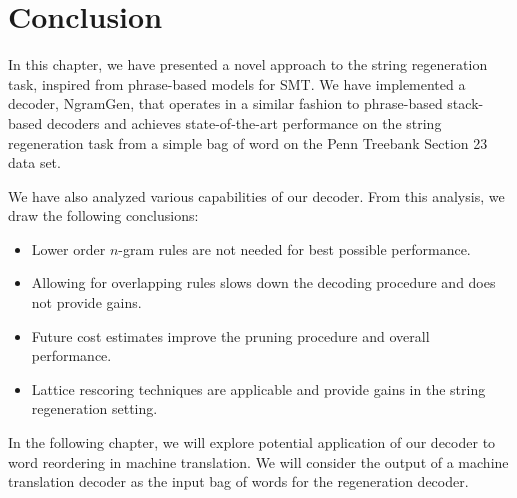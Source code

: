 \section{Conclusion}

In this chapter, we have presented a novel approach to the string regeneration
task, inspired from phrase-based models for SMT.
We have implemented a decoder, NgramGen, that operates in a similar fashion to phrase-based
stack-based decoders and achieves state-of-the-art
performance on the string regeneration task from a simple bag of word on the Penn Treebank
Section 23 data set.

We have also analyzed various capabilities of our decoder.
From this analysis, we draw the following conclusions:
%
\begin{itemize}
  \item Lower order $n$-gram rules are not needed for best possible performance.
  \item Allowing for overlapping rules slows down the decoding procedure and
    does not provide gains.
  \item Future cost estimates improve the pruning procedure and overall performance.
  \item Lattice rescoring techniques are applicable and provide gains in the string
    regeneration setting.
\end{itemize}


In the following chapter, we will explore potential application of our decoder
to word reordering in machine translation. We will consider the output of
a machine translation decoder as the input bag of words for the regeneration decoder.


%

